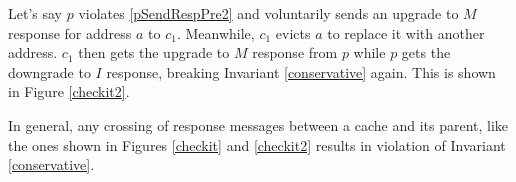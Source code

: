 Let's say $p$ violates \ref{pSendRespPre2} and voluntarily sends an upgrade to
$M$ response for address $a$ to $c_1$.  Meanwhile, $c_1$ evicts $a$ to replace
it with another address. $c_1$ then gets the upgrade to $M$ response from $p$
while $p$ gets the downgrade to $I$ response, breaking Invariant
\ref{conservative} again. This is shown in Figure \ref{checkit2}.

In general, any crossing of response messages between a cache and its parent,
like the ones shown in Figures \ref{checkit} and \ref{checkit2} results in
violation of Invariant \ref{conservative}.
